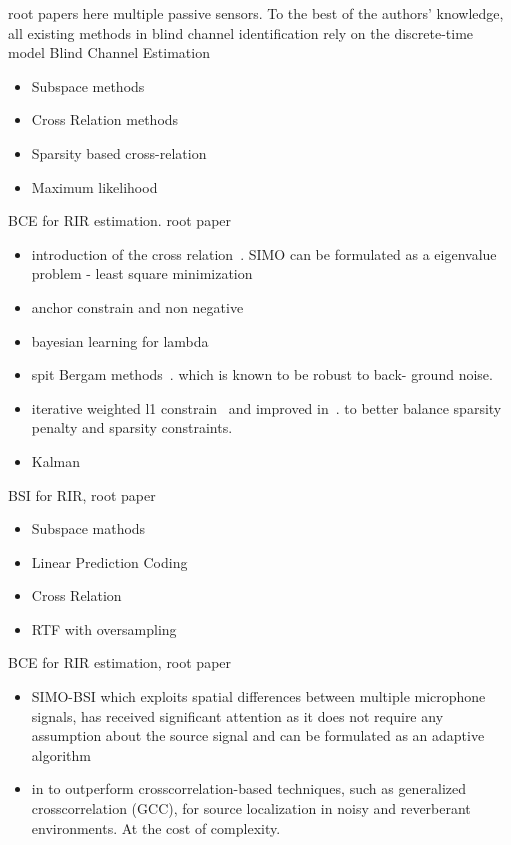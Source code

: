 root papers 
here multiple passive sensors.
To the best of the authors’ knowledge, all existing methods in blind channel identification rely on the discrete-time model
Blind Channel Estimation~
\begin{itemize}
    \item Subspace methods
    \item Cross Relation methods
    \item Sparsity based cross-relation
    \item Maximum likelihood
\end{itemize}

BCE for RIR estimation. root paper 
\begin{itemize}
    \item introduction of the cross relation~. SIMO can be formulated as a eigenvalue problem - least square minimization
    \item anchor constrain and non negative~
    \item bayesian learning for lambda~
    \item spit Bergam methods~. which is known to be robust to back- ground noise.
    \item iterative weighted l1 constrain~ and improved in~.
    to better balance sparsity penalty and sparsity constraints.
    \item Kalman 
\end{itemize}

BSI for RIR, root paper ~
\begin{itemize}
    \item Subspace mathods
    \item Linear Prediction Coding
    \item Cross Relation
    \item RTF with oversampling~
\end{itemize}

BCE for RIR estimation, root paper 
\begin{itemize}
    \item SIMO-BSI which exploits spatial differences between multiple microphone signals, has received significant attention as it does not require any assumption about the source signal and can be formulated as an adaptive algorithm~
    \item in  to outperform crosscorrelation-based techniques, such as generalized crosscorrelation (GCC), for source localization in noisy and reverberant environments. At the cost of complexity.
\end{itemize}


